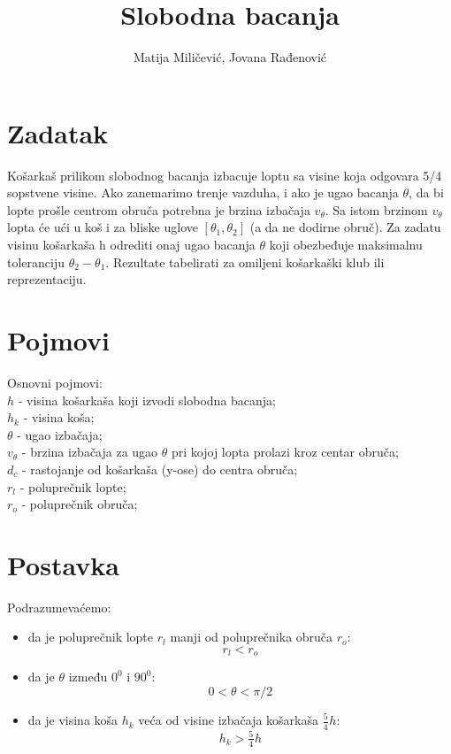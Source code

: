 \documentclass[a4paper, 12pt]{article}
\begin{document}
\title{Slobodna bacanja}

\author{Matija Miličević, Jovana Rađenović}

\maketitle

\section{Zadatak}

Košarkaš prilikom slobodnog bacanja izbacuje loptu sa visine koja odgovara 5/4 sopstvene visine. Ako zanemarimo trenje vazduha, i ako je ugao bacanja $\theta$, da bi lopte prošle centrom obruča potrebna je brzina izbačaja $v_\theta$. Sa istom brzinom $v_\theta$ lopta će ući u koš i za bliske uglove $[\theta_1, \theta_2]$ (a da ne dodirne obruč). Za zadatu visinu košarkaša h odrediti onaj ugao bacanja $\theta$ koji obezbeđuje maksimalnu toleranciju $\theta_2 - \theta_1$. Rezultate tabelirati za omiljeni košarkaški klub ili reprezentaciju.

\section{Pojmovi}

Osnovni pojmovi:\\
$h$ - visina košarkaša koji izvodi slobodna bacanja;\\
$h_k$ - visina koša;\\
$\theta$ - ugao izbačaja;\\
$v_\theta$ - brzina izbačaja za ugao $\theta$ pri kojoj lopta prolazi kroz centar obruča;\\
$d_c$ - rastojanje od košarkaša (y-ose) do centra obruča;\\
$r_l$ - poluprečnik lopte;\\
$r_o$ - poluprečnik obruča;\\


\pagebreak


\section{Postavka} %

Podrazumevaćemo:
\begin{itemize}

\item da je poluprečnik lopte $r_l$ manji od poluprečnika obruča $r_o$:
\[r_l<r_o\] %

\item da je $\theta$ između $0^0$ i $90^0$:\\
\[0 < \theta < \pi/2\]

\item da je visina koša $h_k$ veća od visine izbačaja košarkaša $\dfrac{_5}{^4}h$:\\
\[h_k > \dfrac{_5}{^4}h\]  %

\end{itemize}
\end{document}
